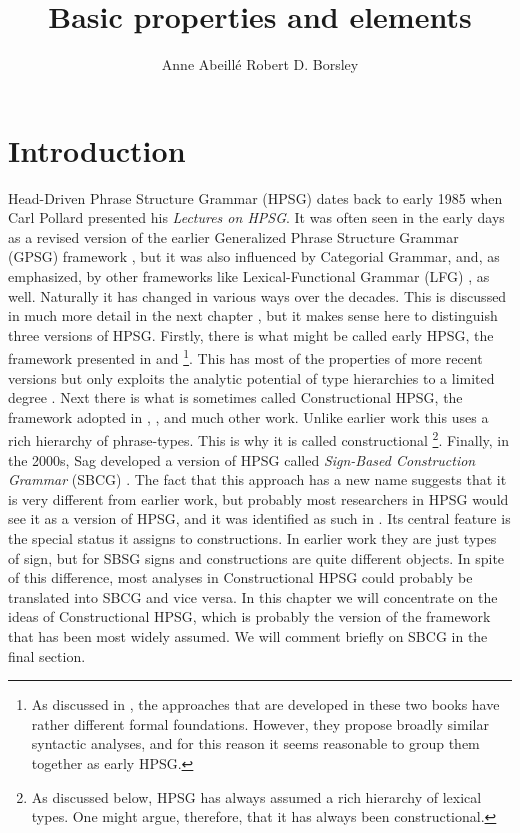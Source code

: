 \documentclass[output=paper
	        ,collection
	        ,collectionchapter
 	        ,biblatex
                ,babelshorthands
                ,newtxmath
                ,draftmode
                ,colorlinks, citecolor=brown
]{langscibook}
\title{Basic properties and elements}
\author{%
 Anne Abeillé\affiliation{Université Paris Diderot}%
 \lastand Robert D. Borsley\affiliation{University of Essex}%
}
\begin{document}
\maketitle
\label{chapter-basic-properties}\label{chap-properties}


\section{Introduction}\label{sec:prop1}
\label{prop:sec-intro}

Head-Driven Phrase Structure Grammar (HPSG) dates back to early 1985 when Carl Pollard presented his \emph{Lectures on HPSG}. It was often seen in the early days as a revised version of the earlier Generalized Phrase Structure Grammar (GPSG) framework \citep*{GKPS85a}, but it was also influenced by Categorial Grammar, and, as \citet[1]{ps} emphasized, by other frameworks like Lexical-Functional Grammar (LFG) \citep{Bresnan82a-ed}, as well. Naturally it has changed in various ways over the decades. This is discussed in much more detail in the next chapter , but it makes sense here to distinguish three versions of HPSG. Firstly, there is what might be called early HPSG, the framework presented in \citet{ps} and \citet{ps2}%
%
\footnote{As discussed in , the approaches that are developed in these two books have rather different formal foundations. However, they propose broadly similar syntactic analyses, and for this reason it seems reasonable to group them together as early HPSG.}.
%
This has most of the properties of more recent versions but only exploits the analytic potential of type hierarchies to a limited degree \citep*{Flickinger87,FPW85a}. Next there is what is sometimes called Constructional HPSG, the framework adopted in , , and much other work. Unlike earlier work this uses a rich hierarchy of phrase-types. This is why it is called constructional%
%
\footnote{As discussed below, HPSG has always assumed a rich hierarchy of lexical types. One might argue, therefore, that it has always been constructional.}.
%
Finally, in the 2000s, Sag developed a version of HPSG called \emph{Sign-Based Construction Grammar} (SBCG) \citep{Sag2012a}. The fact that this approach has a new name suggests that it is very different from earlier work, but probably most researchers in HPSG would see it as a version of HPSG, and it was identified as such in \citet[486]{Sag2010b}. Its central feature is the special status it assigns to constructions. In earlier work they are just types of sign, but for SBSG signs and constructions are quite different objects. In spite of this difference, most analyses in Constructional HPSG could probably be translated into SBCG and vice versa. In this chapter we will concentrate on the ideas of Constructional HPSG, which is probably the version of the framework that has been most widely assumed. We will comment briefly on SBCG in the final section.
\end{document}
